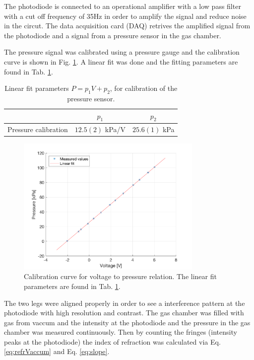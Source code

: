 The photodiode is connected to an operational amplifier with a low pass filter with a cut off frequency of 35Hz in order to amplify the signal and reduce noise in the circut. The data acquisition card (DAQ) retrives the amplified signal from the photodiode and a signal from a pressure sensor in the gas chamber.

The pressure signal was calibrated using a pressure gauge and the calibration curve is shown in Fig. \ref{fig:calibration}. A linear fit was done and the fitting parameters are found in Tab. \ref{tab:calibration}.

\begin{table}[H]
\centering
  \caption{Linear fit parameters $P = p_1 V + p_2$, for calibration of the pressure sensor.}
  \label{tab:calibration}
  \begin{tabular}{c|c|c}
    & $p_1$ & $p_2$ \\ \hline
    Pressure calibration & $12.5(2)$ kPa/V & $25.6(1)$ kPa
  \end{tabular}
\end{table}

\begin{figure}[H]
  \centering
  \includegraphics[width=0.8\textwidth]{matlab/calibration.png}
  \caption{Calibration curve for voltage to pressure relation. The linear fit parameters are found in Tab. \ref{tab:calibration}.}
  \label{fig:calibration}
\end{figure}

The two legs were aligned properly in order to see a interference pattern at the photodiode with high resolution and contrast. The gas chamber was filled with gas from vaccum and the intensity at the photodiode and the pressure in the gas chamber was measured continuously. Then by counting the fringes (intensity peaks at the photodiode) the index of refraction was calculated via Eq. \ref{eq:refrVaccum} and Eq. \ref{eq:slope}.

